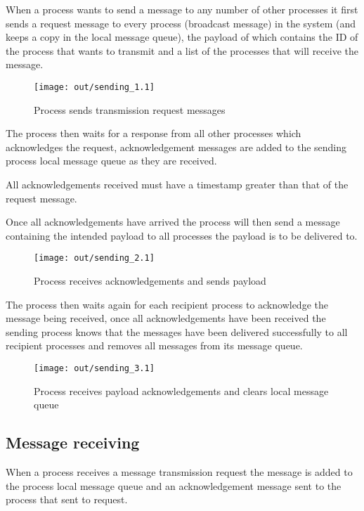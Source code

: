 \documentclass[twocolumn]{article}
\begin{document}
When a process wants to send a message to any number of other processes it first
sends a request message to every process (broadcast message) in the system (and
keeps a copy  in the local message queue), the payload of which contains the ID
of the process that wants to transmit and a list of the processes that will
receive the message.

\begin{figure}[h!]
  \centering
  \texttt{[image: out/sending\_1.1]}
  \caption{Process sends transmission request messages}
  \label{fig:sending_1}
\end{figure}
\FloatBarrier

The process then waits for a response from all other processes which
acknowledges the request, acknowledgement messages are added to the sending
process local message queue as they are received.

All acknowledgements received must have a timestamp greater than that of the
request message.

Once all acknowledgements have arrived the process will then send a message
containing the intended payload to all processes the payload is to be delivered
to.

\begin{figure}[h!]
  \centering
  \texttt{[image: out/sending\_2.1]}
  \caption{Process receives acknowledgements and sends payload}
  \label{fig:sending_2}
\end{figure}
\FloatBarrier

The process then waits again for each recipient process to acknowledge the
message being received, once all acknowledgements have been received the sending
process knows that the messages have been delivered successfully to all
recipient processes and removes all messages from its message queue.

\begin{figure}[h!]
  \centering
  \texttt{[image: out/sending\_3.1]}
  \caption{Process receives payload acknowledgements and clears local message
           queue}
  \label{fig:sending_3}
\end{figure}
\FloatBarrier

\subsection{Message receiving}
\label{sec:receiving}

When a process receives a message transmission request  the message is added
to the process local message queue and an acknowledgement message sent to the
process that sent to request.
\end{document}
